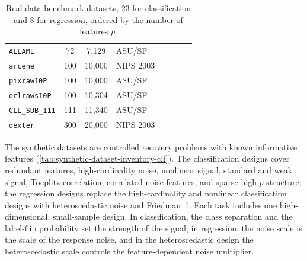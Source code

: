 \begin{table}[tb]
\begin{tabular}{@{}lS[table-format=5.0]S[table-format=5.0]l@{\hspace{2.5em}}lS[table-format=4.0]S[table-format=4.0]l@{}}
    \nolinkurl{ALLAML} & 72 & 7,129 & ASU/SF & & & & \\
    \nolinkurl{arcene} & 100 & 10,000 & NIPS 2003 & & & & \\
    \nolinkurl{pixraw10P} & 100 & 10,000 & ASU/SF & & & & \\
    \nolinkurl{orlraws10P} & 100 & 10,304 & ASU/SF & & & & \\
    \nolinkurl{CLL_SUB_111} & 111 & 11,340 & ASU/SF & & & & \\
    \nolinkurl{dexter} & 300 & 20,000 & NIPS 2003 & & & & \\
    \bottomrule
  \end{tabular}
  \caption{Real-data benchmark datasets, 23 for classification and 8 for
  regression, ordered by the number of features $p$.}
  \label{tab:benchmark-dataset-inventory-clf}
\end{table}

The synthetic datasets are controlled recovery problems with known informative
features (\cref{tab:synthetic-dataset-inventory-clf}). The classification
designs cover redundant features, high-cardinality noise, nonlinear signal,
standard and weak signal, Toeplitz correlation, correlated-noise features, and
sparse high-$p$ structure; the regression designs replace the high-cardinality
and nonlinear classification designs with heteroscedastic noise and Friedman~1.
Each task includes one high-dimensional, small-sample design. In classification,
the class separation and the label-flip probability set the strength of the
signal; in regression, the noise scale is the scale of the response noise, and
in the heteroscedastic design the heteroscedastic scale controls the
feature-dependent noise multiplier.

